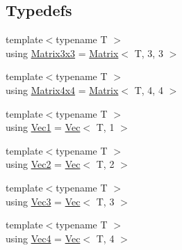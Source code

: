 \subsection*{Typedefs}
\begin{DoxyCompactItemize}
\item 
{\footnotesize template$<$typename T $>$ }\\using \mbox{\hyperlink{namespace_saturn_1_1_math_abf8f005e656124507aa01d3fe30156a5}{Matrix3x3}} = \mbox{\hyperlink{class_saturn_1_1_math_1_1_matrix}{Matrix}}$<$ T, 3, 3 $>$
\item 
{\footnotesize template$<$typename T $>$ }\\using \mbox{\hyperlink{namespace_saturn_1_1_math_a139080fa8f37f668ebd8f6c58a0cea63}{Matrix4x4}} = \mbox{\hyperlink{class_saturn_1_1_math_1_1_matrix}{Matrix}}$<$ T, 4, 4 $>$
\item 
{\footnotesize template$<$typename T $>$ }\\using \mbox{\hyperlink{namespace_saturn_1_1_math_acae4f808f0c3284d0b60ee1ac720deaa}{Vec1}} = \mbox{\hyperlink{class_saturn_1_1_math_1_1_vec}{Vec}}$<$ T, 1 $>$
\item 
{\footnotesize template$<$typename T $>$ }\\using \mbox{\hyperlink{namespace_saturn_1_1_math_a8befc95aeff660bda92b8807c1cc5224}{Vec2}} = \mbox{\hyperlink{class_saturn_1_1_math_1_1_vec}{Vec}}$<$ T, 2 $>$
\item 
{\footnotesize template$<$typename T $>$ }\\using \mbox{\hyperlink{namespace_saturn_1_1_math_af4a7a893730c64ac02b620f648cc5406}{Vec3}} = \mbox{\hyperlink{class_saturn_1_1_math_1_1_vec}{Vec}}$<$ T, 3 $>$
\item 
{\footnotesize template$<$typename T $>$ }\\using \mbox{\hyperlink{namespace_saturn_1_1_math_a311b3d690ef397050af7963caa08d1bd}{Vec4}} = \mbox{\hyperlink{class_saturn_1_1_math_1_1_vec}{Vec}}$<$ T, 4 $>$
\end{DoxyCompactItemize}
